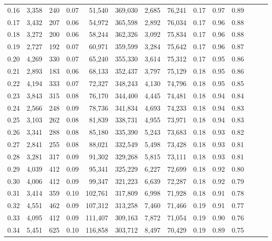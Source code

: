 \begin{tabular}{rrrrrrrrrrrrrr}
0.16 &  3,358 &    240 &  0.07 &   51,540 &  369,030 &   2,685 &  76,241 &  0.17 &  0.97 &      0.89 \\
0.17 &  3,432 &    207 &  0.06 &   54,972 &  365,598 &   2,892 &  76,034 &  0.17 &  0.96 &      0.88 \\
0.18 &  3,272 &    200 &  0.06 &   58,244 &  362,326 &   3,092 &  75,834 &  0.17 &  0.96 &      0.88 \\
0.19 &  2,727 &    192 &  0.07 &   60,971 &  359,599 &   3,284 &  75,642 &  0.17 &  0.96 &      0.87 \\
0.20 &  4,269 &    330 &  0.07 &   65,240 &  355,330 &   3,614 &  75,312 &  0.17 &  0.95 &      0.86 \\
0.21 &  2,893 &    183 &  0.06 &   68,133 &  352,437 &   3,797 &  75,129 &  0.18 &  0.95 &      0.86 \\
0.22 &  4,194 &    333 &  0.07 &   72,327 &  348,243 &   4,130 &  74,796 &  0.18 &  0.95 &      0.85 \\
0.23 &  3,843 &    315 &  0.08 &   76,170 &  344,400 &   4,445 &  74,481 &  0.18 &  0.94 &      0.84 \\
0.24 &  2,566 &    248 &  0.09 &   78,736 &  341,834 &   4,693 &  74,233 &  0.18 &  0.94 &      0.83 \\
0.25 &  3,103 &    262 &  0.08 &   81,839 &  338,731 &   4,955 &  73,971 &  0.18 &  0.94 &      0.83 \\
0.26 &  3,341 &    288 &  0.08 &   85,180 &  335,390 &   5,243 &  73,683 &  0.18 &  0.93 &      0.82 \\
0.27 &  2,841 &    255 &  0.08 &   88,021 &  332,549 &   5,498 &  73,428 &  0.18 &  0.93 &      0.81 \\
0.28 &  3,281 &    317 &  0.09 &   91,302 &  329,268 &   5,815 &  73,111 &  0.18 &  0.93 &      0.81 \\
0.29 &  4,039 &    412 &  0.09 &   95,341 &  325,229 &   6,227 &  72,699 &  0.18 &  0.92 &      0.80 \\
0.30 &  4,006 &    412 &  0.09 &   99,347 &  321,223 &   6,639 &  72,287 &  0.18 &  0.92 &      0.79 \\
0.31 &  3,414 &    359 &  0.10 &  102,761 &  317,809 &   6,998 &  71,928 &  0.18 &  0.91 &      0.78 \\
0.32 &  4,551 &    462 &  0.09 &  107,312 &  313,258 &   7,460 &  71,466 &  0.19 &  0.91 &      0.77 \\
0.33 &  4,095 &    412 &  0.09 &  111,407 &  309,163 &   7,872 &  71,054 &  0.19 &  0.90 &      0.76 \\
0.34 &  5,451 &    625 &  0.10 &  116,858 &  303,712 &   8,497 &  70,429 &  0.19 &  0.89 &      0.75 \\

\end{tabular}
